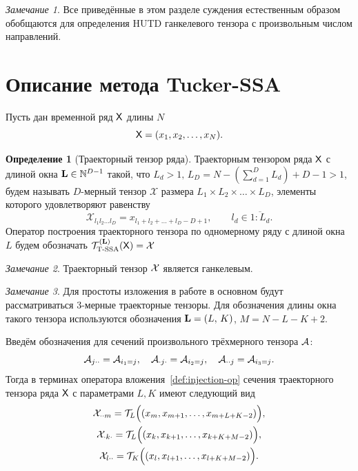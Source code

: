 \documentclass[specialist,
  substylefile = spbu.rtx,
subf,href,colorlinks=true, 12pt]{disser}
\theoremstyle{plain}
\theoremstyle{definition}
\newtheorem{definition}{Определение}[section]
\theoremstyle{remark}
\newtheorem{remark}{Замечание}[section]
\def\tssa/{Tucker-SSA}
\begin{document}
\begin{remark}
  Все приведённые в этом разделе суждения естественным образом обобщаются для
  определения HUTD ганкелевого тензора с произвольным числом направлений.
\end{remark}

\section{Описание метода \tssa/}\label{sec:tssa-method-description}
Пусть дан временной ряд $\mathsf{X}$ длины $N$
\[
  \mathsf{X}=(x_1,x_2,\ldots,x_N).
\]
\begin{definition}[Траекторный тензор ряда]
  \label{def:traj-tensor-ssa}
  Траекторным тензором ряда $\mathsf{X}$ с длиной окна $\mathbf{L}\in
  \mathbb{N}^{D-1}$ такой, что
  $L_d > 1,\, L_D = N - \left(\sum_{d=1}^{D}L_d\right) + D - 1 > 1$,
  будем называть $D$-мерный тензор $\mathcal{X}$ размера $L_1\times
  L_2 \times \ldots \times L_D$, элементы которого удовлетворяют равенству
  \[
    \mathcal{X}_{l_1l_2\ldots l_D}=x_{l_1+l_2+\ldots + l_D- D +
    1},\qquad l_d\in \overline{1:L_d}.
  \]
  Оператор построения траекторного тензора по одномерному ряду с
  длиной окна $L$ будем обозначать
  $\mathcal{T}_{\textrm{T-SSA}}^{(\mathbf{L})}(\mathsf{X}) = \mathcal{X}$
\end{definition}

\begin{remark}
  Траекторный тензор $\mathcal{X}$ является ганкелевым.
\end{remark}
\begin{remark}
  Для простоты изложения в работе в основном будут рассматриваться
  3-мерные траекторные тензоры. Для обозначения длины окна такого
  тензора используются обозначения $\mathbf{L} = (L,\, K)$, $M = N - L - K + 2$.

\end{remark}

Введём обозначения для сечений произвольного трёхмерного тензора $\mathcal{A}$:
\[
  \mathcal{A}_{j \cdot \cdot} = \mathcal{A}_{i_1=j}, \quad
  \mathcal{A}_{\cdot j \cdot} = \mathcal{A}_{i_2=j}, \quad
  \mathcal{A}_{\cdot \cdot j} = \mathcal{A}_{i_3=j}.
\]
Тогда в терминах оператора вложения~\ref{def:injection-op} сечения
траекторного тензора ряда $\mathsf{X}$
с параметрами $L, K$ имеют следующий вид
\begin{gather*}
  \mathcal{X}_{\cdot \cdot m}= \mathcal{T}_L \Big((x_m, x_{m+1}, \ldots,
  x_{m+L+K-2})\Big),\\
  \mathcal{X}_{\cdot k \cdot}= \mathcal{T}_L \Big((x_k, x_{k+1}, \ldots,
  x_{k+K+M-2})\Big),\\
  \mathcal{X}_{l\cdot \cdot}=\mathcal{T}_K \Big((x_l, x_{l+1}, \ldots,
  x_{l+K+M-2})\Big).
\end{gather*}
\end{document}
